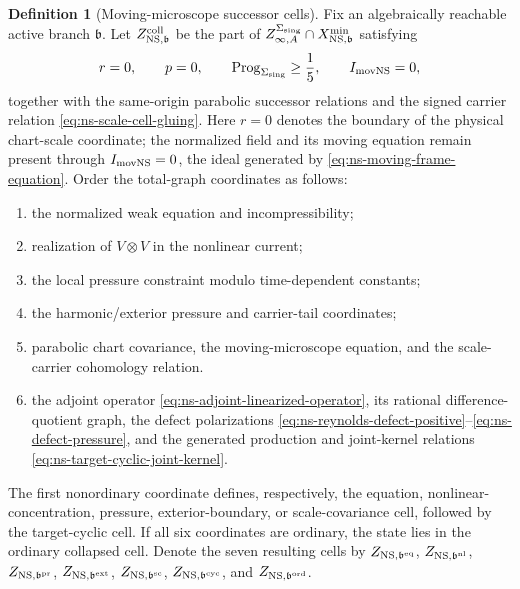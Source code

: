 \documentclass[11pt]{article}
\numberwithin{section}{part}
\theoremstyle{plain}
\theoremstyle{definition}
\newtheorem{definition}[definition]{Definition}
\theoremstyle{remark}
\begin{document}
\begin{definition}[Moving-microscope successor cells]
\label{def:ns-collapsed-successor-cells}
Fix an algebraically reachable active branch \(\mathfrak b\).  Let
\(Z_{{\rm NS},\mathfrak b}^{\rm coll}\) be the part of
\(Z_{\infty,A}^{\Sigma_{\rm sing}}\cap
X^{\min}_{{\rm NS},\mathfrak b}\) satisfying
\begin{equation}
 \label{eq:ns-collapsed-kernel}
 r=0,\qquad p=0,\qquad
 \operatorname{Prog}_{\Sigma_{\rm sing}}\ge\frac15,
 \qquad I_{\rm movNS}=0,
\end{equation}
together with the same-origin parabolic successor relations and the signed
carrier relation \eqref{eq:ns-scale-cell-gluing}.  Here \(r=0\) denotes the
boundary of the physical chart-scale coordinate; the normalized field and
its moving equation remain present through \(I_{\rm movNS}=0\), the ideal
generated by \eqref{eq:ns-moving-frame-equation}.  Order the total-graph
coordinates as follows:
\begin{enumerate}[label=\textup{(N\arabic*)}]
\item the normalized weak equation and incompressibility;
\item realization of \(V\otimes V\) in the nonlinear current;
\item the local pressure constraint modulo time-dependent constants;
\item the harmonic/exterior pressure and carrier-tail coordinates;
\item parabolic chart covariance, the moving-microscope equation, and the
scale-carrier cohomology relation.
\item the adjoint operator \eqref{eq:ns-adjoint-linearized-operator}, its
rational difference-quotient graph, the defect polarizations
\eqref{eq:ns-reynolds-defect-positive}--\eqref{eq:ns-defect-pressure}, and
the generated production and joint-kernel relations
\eqref{eq:ns-target-cyclic-joint-kernel}.
\end{enumerate}
The first nonordinary coordinate defines, respectively, the equation,
nonlinear-concentration, pressure, exterior-boundary, or scale-covariance
cell, followed by the target-cyclic cell.  If all six coordinates are
ordinary, the state lies in the ordinary collapsed cell.  Denote the seven
resulting cells by
\(Z_{{\rm NS},\mathfrak b^{\rm eq}}\),
\(Z_{{\rm NS},\mathfrak b^{\rm nl}}\),
\(Z_{{\rm NS},\mathfrak b^{\rm pr}}\),
\(Z_{{\rm NS},\mathfrak b^{\rm ext}}\),
\(Z_{{\rm NS},\mathfrak b^{\rm sc}}\),
\(Z_{{\rm NS},\mathfrak b^{\rm cyc}}\), and
\(Z_{{\rm NS},\mathfrak b^{\rm ord}}\).
\end{definition}
\end{document}
